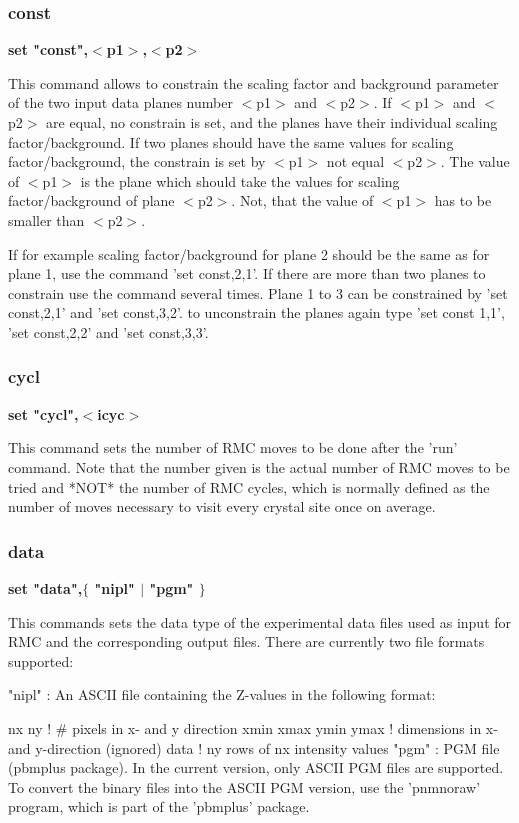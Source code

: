 \subsubsection{const}
{\bf set "const",$ <$p1$> $,$ <$p2$> $ \par }
\par
\vspace{3pt}
This command allows to constrain the scaling factor and background 
parameter of the two input data planes number $ <$p1$> $ and $ <$p2$> $. If 
$ <$p1$> $ and $ <$p2$> $ are equal, no constrain is set, and the planes have 
their individual scaling factor/background. If two planes should have 
the same values for scaling factor/background, the constrain is set 
by $ <$p1$> $ not equal $ <$p2$> $. The value of $ <$p1$> $ is the plane which should 
take the values for scaling factor/background of plane $ <$p2$> $. Not, 
that the value of $ <$p1$> $ has to be smaller than $ <$p2$> $. 
\par
If for example scaling factor/background for plane 2 should be the 
same as for plane 1, use the command 'set const,2,1'. If there are 
more than two planes to constrain use the command several times. 
Plane 1 to 3 can be constrained by 'set const,2,1' and 'set const,3,2'. 
to unconstrain the planes again type 'set const 1,1', 'set const,2,2' 
and 'set const,3,3'. 
\subsubsection{cycl}
{\bf set "cycl",$ <$icyc$> $ \par }
\par
\vspace{3pt}
This command sets the number of RMC moves to be done after the 
'run' command. Note that the number given is the actual number of 
RMC moves to be tried and *NOT* the number of RMC cycles, which 
is normally defined as the number of moves necessary to visit 
every crystal site once on average. 
\subsubsection{data}
{\bf set "data",$ \{$ "nipl" $| $ "pgm" $\} $ \par }
\par
\vspace{3pt}
This commands sets the data type of the experimental data files used 
as input for RMC and the corresponding output files. There are currently 
two file formats supported: 
\par
\begin{MacVerbatim}
"nipl" : An ASCII file containing the Z-values in the following format:

         nx ny                  ! # pixels in x- and y direction
         xmin xmax ymin ymax    ! dimensions in x- and y-direction (ignored)
         data                   ! ny rows of nx intensity values
"pgm"  : PGM file (pbmplus package). In the current version, only
         ASCII PGM files are supported. To convert the binary files
         into the ASCII PGM version, use the 'pnmnoraw' program,
         which is part of the 'pbmplus' package.
\end{MacVerbatim}

